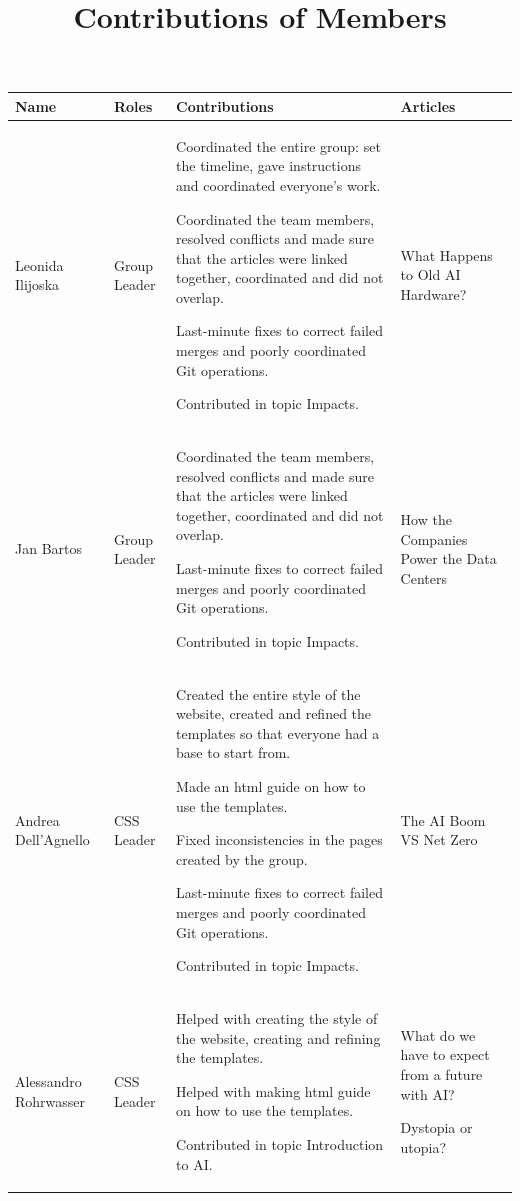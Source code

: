 \documentclass[11pt]{article}
\title{Contributions of Members}
\author{}
\date{}
\begin{document}
\maketitle

\begin{longtable} [c] {|p{3cm}|l|p{7cm}|p{4cm}|}
    \hline
    \textbf{Name} & \textbf{Roles} & \textbf{Contributions} & \textbf{Articles} \\
    \hline
    	Leonida Ilijoska & Group Leader & 
	\par \textbullet{} Coordinated the entire group: set the timeline, gave instructions and coordinated everyone’s work.
	\par \textbullet{} Coordinated the team members, resolved conflicts and made sure that the articles were linked together, coordinated and did not overlap.
	\par \textbullet{}  Last-minute fixes to correct failed merges and poorly coordinated Git operations.
	\par \textbullet{} Contributed in topic Impacts. &
	What Happens to Old AI Hardware?\\ 
	\hline
	
	Jan Bartos & Group Leader &
	\par \textbullet{} Coordinated the team members, resolved conflicts and made sure that the articles were linked together, coordinated and did not overlap.
	\par \textbullet{}  Last-minute fixes to correct failed merges and poorly coordinated Git operations.
	\par \textbullet{} Contributed in topic Impacts. &
	How the Companies Power the Data Centers\\ 
	\hline
	
	Andrea Dell'Agnello & CSS Leader &
	\par \textbullet{} Created the entire style of the website, created and refined the templates so that everyone had a base to start from. 
	\par \textbullet{} Made an html guide on how to use the templates.	
	\par \textbullet{} Fixed inconsistencies in the pages created by the group.
	\par \textbullet{}  Last-minute fixes to correct failed merges and poorly coordinated Git operations.
	\par \textbullet{} Contributed in topic Impacts. &
	The AI Boom VS Net Zero\\ 
	\hline
	
	Alessandro Rohrwasser & CSS Leader &
	\par \textbullet{} Helped with creating the style of the website, creating and refining the templates.
	\par  \textbullet{} Helped with making html guide on how to use the templates.
	\par \textbullet{} Contributed in topic Introduction to AI. &
	\par \textbullet{} What do we have to expect from a future with AI?
	\par \textbullet{} Dystopia or utopia?\\ 
	\hline
	

\end{longtable}
\end{document}
